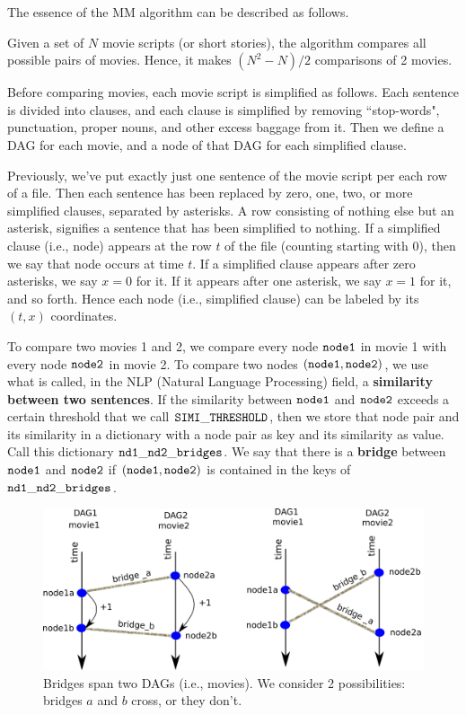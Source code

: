 \documentclass[12pt]{article}
\begin{document}
The essence of the MM algorithm can be described as follows.

Given a set of $N$ movie scripts (or short stories),
the algorithm compares all possible pairs of movies.
Hence, it makes $(N^2-N)/2$
 comparisons of 2 movies.

Before comparing movies, each movie script is simplified as follows.
Each sentence is divided into clauses,
and each clause is simplified by removing
``stop-words", punctuation, proper nouns, and other excess baggage from it.
Then we define a DAG for each movie, and a node of that DAG for each
simplified clause. 

Previously, we've put exactly just one sentence 
of the movie script per each row of a file.
Then each sentence has been 
replaced by zero, one, two, or more simplified clauses, separated by asterisks. A row consisting
of nothing else but an asterisk, signifies
a sentence that has been simplified to nothing.
If  a simplified clause (i.e., node) appears at the
row $t$ of the file (counting starting with 0), then 
we say that node occurs at time $t$. If a simplified clause appears after zero asterisks, we say $x=0$ for it.
If it appears after one asterisk, we say $x=1$ for it, and so forth. Hence each node (i.e., simplified clause)
can be labeled by its $(t,x)$ coordinates.



To compare two movies 1 and 2,
we compare every node $\tt node1$
in movie 1 with every node $\tt node2$ in movie 2.
To compare two nodes $\tt (node1, node2)$,
we use what is called, in the NLP (Natural Language Processing)
field, a {\bf similarity between two sentences}. 
If the similarity
between $\tt node1$ and $\tt node2$ exceeds a certain threshold
that we call $\tt SIMI\_THRESHOLD$,
then we store that node pair and its
similarity in a dictionary with
a node pair as key and its similarity 
as value. Call this dictionary $\tt nd1\_nd2\_bridges$.
We say that there is a {\bf bridge} 
between $\tt node1$ and $\tt node2$
if $\tt (node1, node2)$ is contained 
in the keys of $\tt nd1\_nd2\_bridges$.

\begin{figure}[h!]
\centering
\includegraphics[width=5in]
{crossing-bridges.png}
\caption{Bridges span two DAGs (i.e., movies). We consider 2 possibilities:
bridges $a$ and $b$ cross,
or they don't. 
}
\label{fig-crossing-bridges}
\end{figure}
\end{document}
